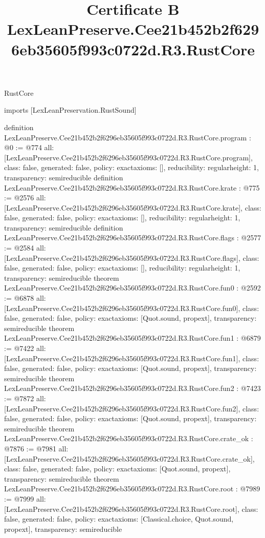 \begin{lexlean}{RustCore}
\title{Certificate B LexLeanPreserve.Cee21b452b2f6296eb35605f993c0722d.R3.RustCore}
\begin{coremodule}
imports [LexLeanPreservation.RustSound]

definition LexLeanPreserve.Cee21b452b2f6296eb35605f993c0722d.R3.RustCore.program : @0 := @774 {
  all: [LexLeanPreserve.Cee21b452b2f6296eb35605f993c0722d.R3.RustCore.program],
  class: false,
  generated: false,
  policy: exact{axioms: []},
  reducibility: regular{height: 1},
  transparency: semireducible
}
definition LexLeanPreserve.Cee21b452b2f6296eb35605f993c0722d.R3.RustCore.krate : @775 := @2576 {
  all: [LexLeanPreserve.Cee21b452b2f6296eb35605f993c0722d.R3.RustCore.krate],
  class: false,
  generated: false,
  policy: exact{axioms: []},
  reducibility: regular{height: 1},
  transparency: semireducible
}
definition LexLeanPreserve.Cee21b452b2f6296eb35605f993c0722d.R3.RustCore.flags : @2577 := @2584 {
  all: [LexLeanPreserve.Cee21b452b2f6296eb35605f993c0722d.R3.RustCore.flags],
  class: false,
  generated: false,
  policy: exact{axioms: []},
  reducibility: regular{height: 1},
  transparency: semireducible
}
theorem LexLeanPreserve.Cee21b452b2f6296eb35605f993c0722d.R3.RustCore.fun0 : @2592 := @6878 {
  all: [LexLeanPreserve.Cee21b452b2f6296eb35605f993c0722d.R3.RustCore.fun0],
  class: false,
  generated: false,
  policy: exact{axioms: [Quot.sound, propext]},
  transparency: semireducible
}
theorem LexLeanPreserve.Cee21b452b2f6296eb35605f993c0722d.R3.RustCore.fun1 : @6879 := @7422 {
  all: [LexLeanPreserve.Cee21b452b2f6296eb35605f993c0722d.R3.RustCore.fun1],
  class: false,
  generated: false,
  policy: exact{axioms: [Quot.sound, propext]},
  transparency: semireducible
}
theorem LexLeanPreserve.Cee21b452b2f6296eb35605f993c0722d.R3.RustCore.fun2 : @7423 := @7872 {
  all: [LexLeanPreserve.Cee21b452b2f6296eb35605f993c0722d.R3.RustCore.fun2],
  class: false,
  generated: false,
  policy: exact{axioms: [Quot.sound, propext]},
  transparency: semireducible
}
theorem LexLeanPreserve.Cee21b452b2f6296eb35605f993c0722d.R3.RustCore.crate_ok : @7876 := @7981 {
  all: [LexLeanPreserve.Cee21b452b2f6296eb35605f993c0722d.R3.RustCore.crate_ok],
  class: false,
  generated: false,
  policy: exact{axioms: [Quot.sound, propext]},
  transparency: semireducible
}
theorem LexLeanPreserve.Cee21b452b2f6296eb35605f993c0722d.R3.RustCore.root : @7989 := @7999 {
  all: [LexLeanPreserve.Cee21b452b2f6296eb35605f993c0722d.R3.RustCore.root],
  class: false,
  generated: false,
  policy: exact{axioms: [Classical.choice, Quot.sound, propext]},
  transparency: semireducible
}


\end{coremodule}
\end{lexlean}
